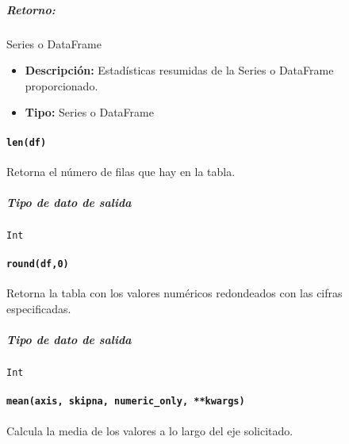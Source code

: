 \subparagraph{Retorno:} Series o DataFrame
\begin{itemize}
    \item \textbf{Descripción:} Estadísticas resumidas de la Series o DataFrame
          proporcionado.
    \item \textbf{Tipo:} Series o DataFrame
\end{itemize}

\paragraph{\texttt{len(df)}} Retorna el número de filas que hay en la tabla.
\subparagraph{Tipo de dato de salida} \texttt{Int}

\paragraph{\texttt{round(df,0)}} Retorna la tabla con los valores numéricos
redondeados con las cifras especificadas.
\subparagraph{Tipo de dato de salida} \texttt{Int}

\paragraph{\texttt{mean(axis, skipna, numeric\_only, **kwargs)}} Calcula la
media de los valores a lo largo del eje solicitado.

